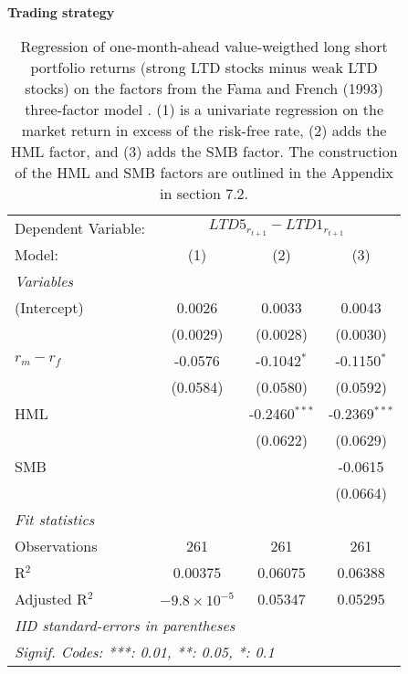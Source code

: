 \begin{table}[H]
\caption{\\ \large{\textbf{Trading strategy}}}
\captionsetup{justification = justified, width = \linewidth}
\caption*{Regression of one-month-ahead value-weigthed long  short portfolio returns 
                               (strong LTD stocks minus weak LTD stocks) on the
                               factors from the Fama and French (1993) three-factor model . (1) is a univariate regression
                               on the market return in excess of the risk-free rate, (2) adds
                               the HML factor, and (3) adds the SMB factor. The construction of the 
                               HML and SMB factors are outlined in the Appendix in section 7.2.}
   \centering
\label{trading_strategy_label}
   \begin{tabular}{lccc}
      \tabularnewline \midrule \midrule
      Dependent Variable: & \multicolumn{3}{c}{$LTD5_{r_{t+1}} - LTD1_{r_{t+1}}$}\\
      Model:          & (1)                   & (2)             & (3)\\  
      \midrule
      \emph{Variables}\\
      (Intercept)     & 0.0026                & 0.0033          & 0.0043\\   
                      & (0.0029)              & (0.0028)        & (0.0030)\\   
      $r_{m} - r_{f}$ & -0.0576               & -0.1042$^{*}$   & -0.1150$^{*}$\\   
                      & (0.0584)              & (0.0580)        & (0.0592)\\   
      HML             &                       & -0.2460$^{***}$ & -0.2369$^{***}$\\   
                      &                       & (0.0622)        & (0.0629)\\   
      SMB             &                       &                 & -0.0615\\   
                      &                       &                 & (0.0664)\\   
      \midrule
      \emph{Fit statistics}\\
      Observations    & 261                   & 261             & 261\\  
      R$^2$           & 0.00375               & 0.06075         & 0.06388\\  
      Adjusted R$^2$  & $-9.8\times 10^{-5}$  & 0.05347         & 0.05295\\  
      \midrule \midrule
      \multicolumn{4}{l}{\emph{IID standard-errors in parentheses}}\\
      \multicolumn{4}{l}{\emph{Signif. Codes: ***: 0.01, **: 0.05, *: 0.1}}\\
   \end{tabular}
\end{table}
